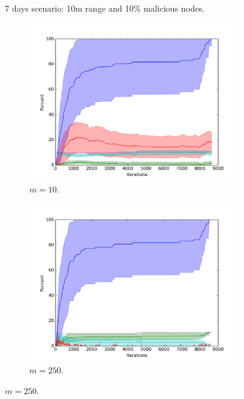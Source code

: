 \begin{figure}
\caption{7 days scenario: 10m range and 10\% malicious nodes.}
\label{fig:random7}
\end{figure}


\begin{figure}

\begin{subfigure}{0.5\textwidth}
\includegraphics[width=\linewidth]{images/plots/extra_malicious/1_10}
\caption{$m = 10$.} \label{fig:extra10}
\end{subfigure}
\hspace*{\fill} %
\begin{subfigure}{0.5\textwidth}
\includegraphics[width=\linewidth]{images/plots/extra_malicious/1_250}
\caption{$m = 250$.} \label{fig:extra250}
\end{subfigure}


\end{figure}
